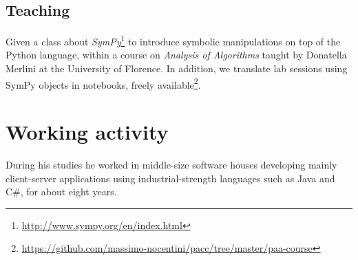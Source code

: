 \documentclass[10pt,a4paper]{scrartcl}
\begin{document}
    \subsection{Teaching}

    Given a class about \emph{SymPy}\footnote{\url{http://www.sympy.org/en/index.html}} to introduce
    symbolic manipulations on top of the Python language, within a course on \emph{Analysis of Algorithms}
    taught by Donatella Merlini at the University of Florence. In addition, we translate lab sessions using
    SymPy objects in notebooks, freely available\footnote{\url{https://github.com/massimo-nocentini/pacc/tree/master/paa-course}}.

    \section{Working activity}

    During his studies he worked in middle-size software houses developing mainly client-server
    applications using industrial-strength languages such as Java and C\#, for about eight years.
        
    
\end{document}
